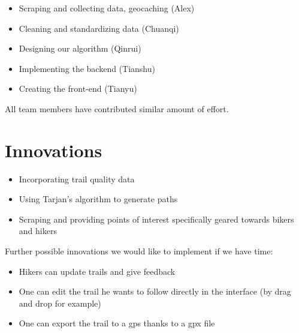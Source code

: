 \documentclass[sigconf]{acmart}
\begin{document}
\begin{itemize}
	\item Scraping and collecting data, geocaching (Alex)
	\item Cleaning and standardizing data (Chuanqi)
	\item Designing our algorithm (Qinrui)
	\item Implementing the backend (Tianshu)
	\item Creating the front-end (Tianyu)
\end{itemize}

All team members have contributed similar amount of effort.

\section{Innovations}
\begin{itemize}
	\item Incorporating trail quality data
	\item Using Tarjan's algorithm to generate paths
	\item Scraping and providing points of interest specifically geared towards bikers and hikers
\end{itemize}

Further possible innovations we would like to implement if we have time:
\begin{itemize}
	\item Hikers can update trails and give feedback
	\item One can edit the trail he wants to follow directly in the interface (by drag and drop for example)
	\item One can export the trail to a gps thanks to a gpx file
\end{itemize}
\end{document}
